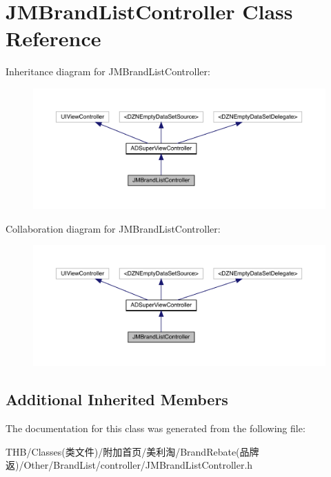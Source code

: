 \hypertarget{interface_j_m_brand_list_controller}{}\section{J\+M\+Brand\+List\+Controller Class Reference}
\label{interface_j_m_brand_list_controller}


Inheritance diagram for J\+M\+Brand\+List\+Controller\+:\nopagebreak
\begin{figure}[H]
\begin{center}
\leavevmode
\includegraphics[width=350pt]{interface_j_m_brand_list_controller__inherit__graph}
\end{center}
\end{figure}


Collaboration diagram for J\+M\+Brand\+List\+Controller\+:\nopagebreak
\begin{figure}[H]
\begin{center}
\leavevmode
\includegraphics[width=350pt]{interface_j_m_brand_list_controller__coll__graph}
\end{center}
\end{figure}
\subsection*{Additional Inherited Members}


The documentation for this class was generated from the following file\+:\begin{DoxyCompactItemize}
\item 
T\+H\+B/\+Classes(类文件)/附加首页/美利淘/\+Brand\+Rebate(品牌返)/\+Other/\+Brand\+List/controller/J\+M\+Brand\+List\+Controller.\+h\end{DoxyCompactItemize}

